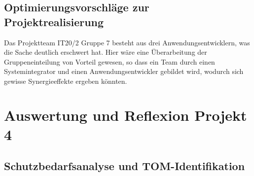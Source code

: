 \documentclass[a4paper,
    11pt,
    headings=small,
    ngerman,
    listof=totoc,
    numbers=noenddot]{scrreprt}[2021/11/13]
\begin{document}
\section{Optimierungsvorschläge zur Projektrealisierung}

Das Projektteam IT20/2 Gruppe 7 besteht aus drei Anwendungsentwicklern, was die Sache deutlich erschwert hat. Hier wäre eine Überarbeitung der Gruppeneinteilung von Vorteil gewesen, so dass ein Team durch einen Systemintegrator und einen Anwendungsentwickler gebildet wird, wodurch sich gewisse Synergieeffekte ergeben könnten.



\chapter{Auswertung und Reflexion Projekt 4}


\section{Schutzbedarfsanalyse und TOM-Identifikation}
\end{document}
